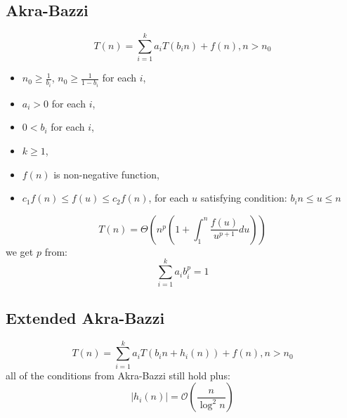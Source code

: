 \begin{multicols}{5}
\section{Akra-Bazzi}
\[
	T(n) = \sum_{i=1}^ka_iT(b_in)+f(n), n > n_0
\]
\begin{itemize}
	\item $n_0 \geq \frac{1}{b_i}$, $n_0 \geq \frac{1}{1-b_i}$ for each $i$,
	\item $a_i > 0$ for each $i$,
	\item $0<b_i$ for each $i$,
	\item $k \geq 1$,
	\item $f(n)$ is non-negative function,
	\item $c_1f(n) \leq f(u) \leq c_2f(n)$, for each $u$ satisfying condition: $b_in\leq u\leq n$
\end{itemize}
\[
	T(n) = \Theta(n^p(1+\int_1^n\frac{f(u)}{u^{p+1}}du))
\]
we get $p$ from:
\[
	\sum_{i=1}^ka_ib_i^p=1
\]
\subsection{Extended Akra-Bazzi}
\[
	T(n) = \sum_{i=1}^ka_iT(b_in+h_i(n))+f(n), n > n_0
\]
all of the conditions from Akra-Bazzi still hold plus:
\[
	|h_i(n)| = \mathcal{O}(\frac{n}{\log^2n})
\]


\end{multicols}

